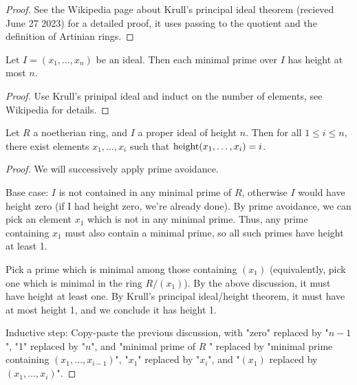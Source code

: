 \begin{proof}
    See the Wikipedia page about Krull's principal ideal theorem
    (recieved June 27 2023) for a detailed proof,
    it uses passing to the quotient and the definition of
    Artinian rings.
\end{proof}

\begin{theorem}
    \label{thm:krull_height}
    Let \(I = (x_{1}, \ldots, x_{n})\) be an ideal. 
    Then each minimal prime over \(I\) has height
    at most \(n\).
\end{theorem}

\begin{proof}
    Use Krull's prinipal ideal and induct on the 
    number of elements, see Wikipedia for details.
\end{proof}

\begin{theorem}
    \label{thm:genset_of_any_height_of_noetherian_height_n}
    Let \(R\) a noetherian ring, and \(I\) a proper 
    ideal of height \(n\).
    Then for all \(1 \leq i \leq n\),
    there exist elements \(x_{1}, \ldots, x_{i}\)
    such that
    \(\operatorname{height} (x_{1}, \ldots, x_{i}) = i\).
\end{theorem}

\begin{proof}
    We will successively apply prime avoidance.

    Base case: 
    \(I\) is not contained in any minimal prime of \(R\),
    otherwise \(I\) would have height zero (if I had height
    zero, we're already done).
    By prime avoidance, we can pick an element \(x_{1}\) which is
    not in any minimal prime. 
    Thus, any prime containing \(x_{1}\) must also contain a minimal prime, so
    all such primes have height at least 1.
    
    Pick a prime which is minimal among those containing \((x_{1})\)
    (equivalently, pick one which is minimal in the ring \(R / (x_{1})\)).
    By the above discussion, it must have height at least one. 
    By Krull's principal ideal/height theorem, it must have at most height 1,
    and we conclude it has height 1.

    Inductive step:
    Copy-paste the previous discussion, with "zero" replaced by "\(n-1\)",
    "1" replaced by "\(n\)", and "minimal prime of \(R\) " replaced by
    "minimal prime containing \((x_{1}, \ldots, x_{i-1})\)", 
    "\(x_{1}\)" replaced by "\(x_{i}\)", and
    "\((x_{1})\) replaced by \((x_{1}, \ldots, x_{i})\)".
   
\end{proof}


